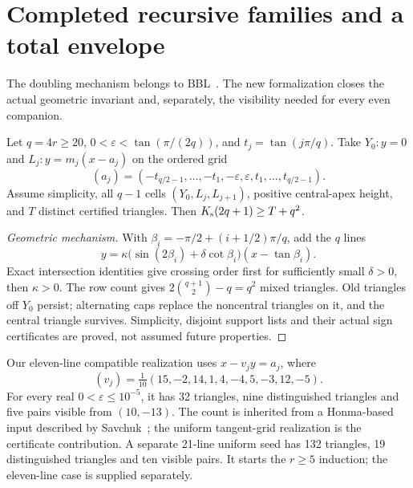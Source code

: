 \section{Completed recursive families and a total envelope}
\label{jfam:section}

The doubling mechanism belongs to BBL~\cite{bbl2008}. The new formalization closes the actual geometric invariant and, separately, the visibility needed for every even companion.

\begin{theorem}\label{jfam:doubling}
Let $q=4r\ge20$, $0<\varepsilon<\tan(\pi/(2q))$, and $t_j=\tan(j\pi/q)$. Take $Y_0:y=0$ and $L_j:y=m_j(x-a_j)$ on the ordered grid
\[
 (a_j)=(-t_{q/2-1},\ldots,-t_1,-\varepsilon,\varepsilon,t_1,\ldots,t_{q/2-1}).
\]
Assume simplicity, all $q-1$ cells $(Y_0,L_j,L_{j+1})$, positive central-apex height, and $T$ distinct certified triangles. Then $K_{\mathrm s}(2q+1)\ge T+q^2$.
\end{theorem}
\begin{proof}[Geometric mechanism]
With $\beta_i=-\pi/2+(i+1/2)\pi/q$, add the $q$ lines
\[
 y=\kappa\bigl(\sin(2\beta_i)+\delta\cot\beta_i\bigr)(x-\tan\beta_i).
\]
Exact intersection identities give crossing order first for sufficiently small $\delta>0$, then $\kappa>0$. The row count gives $2\binom{q+1}{2}-q=q^2$ mixed triangles. Old triangles off $Y_0$ persist; alternating caps replace the noncentral triangles on it, and the central triangle survives. Simplicity, disjoint support lists and their actual sign certificates are proved, not assumed future properties.
\end{proof}

Our eleven-line compatible realization uses $x-v_jy=a_j$, where
\[
 (v_j)=\tfrac1{10}(15,-2,14,1,4,-4,5,-3,12,-5).
\]
For every real $0<\varepsilon\le10^{-5}$, it has 32 triangles, nine distinguished triangles and five pairs visible from $(10,-13)$. The count is inherited from a Honma-based input described by Savchuk~\cite{savchuk2025}; the uniform tangent-grid realization is the certificate contribution. A separate 21-line uniform seed has 132 triangles, 19 distinguished triangles and ten visible pairs. It starts the $r\ge5$ induction; the eleven-line case is supplied separately.

